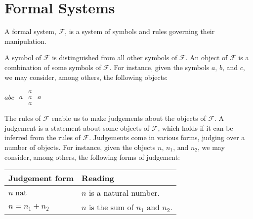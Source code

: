 
\section{Formal Systems}

\begin{notion}

A formal system, $\mathcal{F}$, is a system of symbols and rules governing
their manipulation.

\end{notion}

A symbol of $\mathcal{F}$ is distinguished from all other symbols of
$\mathcal{F}$. An object of $\mathcal{F}$ is a combination of some symbols of
$\mathcal{F}$. For instance, given the symbols $a$, $b$, and $c$, we may
consider, among others, the following objects:

\begin{center}
$abc$
\quad\quad\quad
$\begin{matrix}
  & a &   \\
a & a & a \\
  & a &
\end{matrix}$
\quad\quad\quad
{}

\end{center}

The rules of $\mathcal{F}$ enable us to make judgements about the objects of
$\mathcal{F}$. A judgement is a statement about some objects of $\mathcal{F}$,
which holds if it can be inferred from the rules of $\mathcal{F}$.  Judgements
come in various forms, judging over a number of objects. For instance, given
the objects $n$, $n_1$, and $n_2$, we may consider, among others, the following
forms of judgement:

\begin{table}[h]
\centering
\begin{tabular}{|l|l|}
\hline
\textbf{Judgement form} & \textbf{Reading} \\
\hline
$n\;\text{nat}$ & $n$ is a natural number. \\
\hline
$n=n_1+n_2$ & $n$ is the sum of $n_1$ and $n_2$.\\
\hline
\end{tabular}
\end{table}

